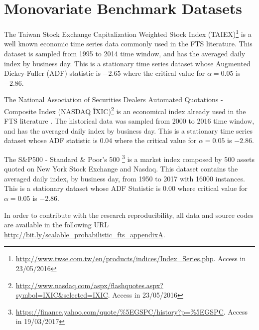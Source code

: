 \chapter{Monovariate Benchmark Datasets}
\label{apd:monovariate_datasets}

The Taiwan Stock Exchange Capitalization Weighted Stock Index (TAIEX)\footnote{\url{http://www.twse.com.tw/en/products/indices/Index_Series.php}. Access in 23/05/2016} is a well known economic time series data commonly used in the FTS literature. This dataset is sampled from 1995 to 2014 time window, and has the averaged daily index by business day. This is a stationary time series dataset whose Augmented Dickey-Fuller (ADF) statistic is $-2.65$ where the critical value for $\alpha = 0.05$ is $-2.86$.


The National Association of Securities Dealers Automated Quotations -  Composite Index (NASDAQ \^IXIC)\footnote{\url{http://www.nasdaq.com/aspx/flashquotes.aspx?symbol=IXIC\&selected=IXIC}. Access in 23/05/2016} is an economical index already used in the FTS literature . The historical data was sampled from 2000 to 2016 time window, and has the averaged daily index by business day. This is a stationary time series dataset whose ADF statistic is $0.04$ where the critical value for $\alpha = 0.05$ is $-2.86$.

The S\&P500 - Standard \& Poor's 500 \footnote{\url{https://finance.yahoo.com/quote/\%5EGSPC/history?p=\%5EGSPC}. Access in 19/03/2017} is a market index composed by 500 assets quoted on New York Stock Exchange and Nasdaq. This dataset contains the averaged daily index, by business day, from 1950 to 2017 with 16000 instances. This is a stationary dataset whose ADF Statistic is 0.00 where critical value for $\alpha = 0.05$ is $-2.86$.

In order to contribute with the research reproducibility, all data and source codes are available in the following URL \url{http://bit.ly/scalable_probabilistic_fts_appendixA}.

